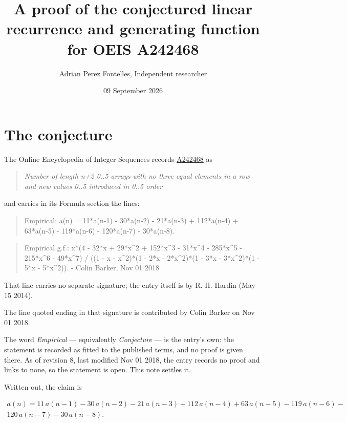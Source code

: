 \documentclass[11pt]{article}
\title{A proof of the conjectured linear recurrence and generating function for OEIS A242468}
\author{Adrian Perez Fontelles, Independent researcher}
\date{09 September 2026}
\theoremstyle{definition}
\begin{document}
\maketitle
\section{The conjecture}

The Online Encyclopedia of Integer Sequences records \href{https://oeis.org/A242468}{A242468} as

\begin{quote}\itshape Number of length n+2 0..5 arrays with no three equal elements in a row and new values 0..5 introduced in 0..5 order\end{quote}

and carries in its Formula section the lines:

\begin{quote}\ttfamily Empirical: a(n) = 11*a(n-1) - 30*a(n-2) - 21*a(n-3) + 112*a(n-4) + 63*a(n-5) - 119*a(n-6) - 120*a(n-7) - 30*a(n-8).\end{quote}

\begin{quote}\ttfamily Empirical g.f.: x*(4 - 32*x + 29*x\textasciicircum{}2 + 152*x\textasciicircum{}3 - 31*x\textasciicircum{}4 - 285*x\textasciicircum{}5 - 215*x\textasciicircum{}6 - 49*x\textasciicircum{}7) / ((1 - x - x\textasciicircum{}2)*(1 - 2*x - 2*x\textasciicircum{}2)*(1 - 3*x - 3*x\textasciicircum{}2)*(1 - 5*x - 5*x\textasciicircum{}2)). - Colin Barker, Nov 01 2018\end{quote}

That line carries no separate signature; the entry itself is by R. H. Hardin (May 15 2014).

The line quoted ending in that signature is contributed by Colin Barker on Nov 01 2018.

The word {\itshape Empirical} --- equivalently {\itshape Conjecture} --- is the entry's own: the statement is recorded as fitted to the published terms, and no proof is given there. As of revision 8, last modified Nov 01 2018, the entry records no proof and links to none, so the statement is open. This note settles it.

Written out, the claim is

\begin{multline*} a(n) = 11\,a(n-1) - 30\,a(n-2) - 21\,a(n-3) + 112\,a(n-4) + 63\,a(n-5) - 119\,a(n-6) - \\ 120\,a(n-7) - 30\,a(n-8). \end{multline*}
\end{document}
